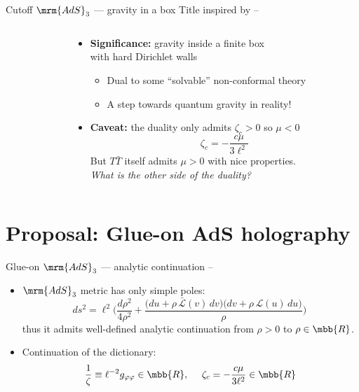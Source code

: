 \documentclass[aspectratio=169,10pt
	,noamsthm
]{beamer}
\newcommand{\TTbar}{\texorpdfstring{\ensuremath{T\bar{T}}}{TTbar}\xspace}
\begin{document}
\begin{frame}{Cutoff $\mrm{AdS}_3$ --- gravity in a box}{%
	Title inspired by
	\textcite{Kraus:2021cwf} -- %
}
\begin{columns}
\begin{column}{.35\textwidth}
\figCutoffAds
\end{column}
\begin{column}{.65\textwidth}
\vspace{-.5\baselineskip}
	\begin{itemize}
	\item \textbf{Significance:} gravity inside a finite box\\
		with hard Dirichlet walls
	
	\begin{itemize}
		\item Dual to some ``solvable'' non-conformal theory
		\item A step towards quantum gravity in reality!
	\end{itemize}
	
\pause
	\item \textbf{Caveat:} the duality only admits $\zeta_c > 0$ so $\mu < 0$
	\begin{equation}
		\zeta_c = - \frac{c \mu}{3\ell^2}
	\end{equation}
	But \TTbar itself admits $\mu > 0$ with nice properties.\\
	\textit{What is the other side of the duality?}
	\end{itemize}
\end{column}
\end{columns}
\end{frame}

\section{\textbf{Proposal:} Glue-on AdS holography} \label{se:glueonproposal}

\begin{frame}{Glue-on $\mrm{AdS}_3$ --- analytic continuation}{%
	\textcite{Apolo:2023vnm} -- 
}
	\begin{itemize}
	\item $\mrm{AdS}_3$ metric has only simple poles:
	\begin{equation}
		ds^2 = \ell^2 \bigg( \frac{d\rho^2}{4 \rho^2} + \frac{ \big( du + \rho \, \mathcal {\bar L}(v)\, dv \big) \big( dv + \rho \, \mathcal L(u)\, du \big) }{\rho} \bigg)\ %
	\end{equation}
	thus it admits well-defined analytic continuation from $\rho > 0$ to $\rho \in \mbb{R}$.
	\item Continuation of the dictionary:
	\begin{equation}
		\frac{1}{\zeta} \equiv \ell^{-2} g_{\varphi\varphi} \in \mbb{R},
	\ \quad
		\zeta_c = - \frac{c \mu}{3\ell^2} \in \mbb{R}
	\end{equation}
	
	\end{itemize}
\end{frame}
\end{document}
